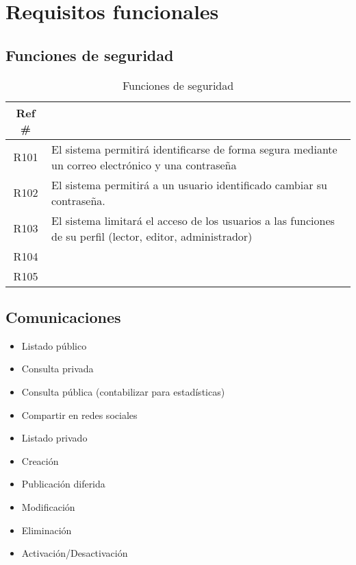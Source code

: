 \section{Requisitos funcionales}

\subsection{Funciones de seguridad}
\begin{table}[ht]
    \centering
    \begin{tabularx}{\textwidth}{|cX|}
    \rowcolor[HTML]{9B9B9B} 
    {\color[HTML]{FFFFFF} Ref \#} &
      \multicolumn{1}{l}{\cellcolor[HTML]{9B9B9B}{\color[HTML]{FFFFFF} Función}} \\ \hline
    R101\label{R101} & El sistema permitirá identificarse de forma segura mediante un correo electrónico y una contraseña \\
    R102\label{R102} & El sistema permitirá a un usuario identificado cambiar su contraseña.  \\
    R103\label{R}    & El sistema limitará el acceso de los usuarios a las funciones de su perfil (lector, editor, administrador) \\
    R104\label{R}    &  \\
    R105\label{R}    &  \\ \hline
    \end{tabularx}
    \caption{Funciones de seguridad}
    \label{cuadro:funciones-de-seguridad }
\end{table}


\subsection{Comunicaciones}
\begin{itemize}
  \item Listado público
  \item Consulta privada
  \item Consulta pública (contabilizar para estadísticas)
  \item Compartir en redes sociales
  \item Listado privado
  \item Creación
  \item Publicación diferida
  \item Modificación
  \item Eliminación
  \item Activación/Desactivación
\end{itemize}

